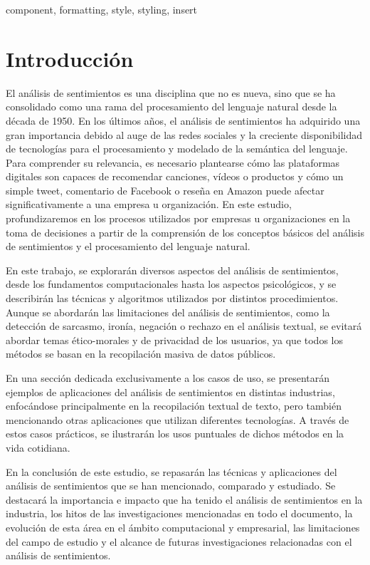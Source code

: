 \documentclass[conference]{IEEEtran}
\begin{document}
\begin{IEEEkeywords}
component, formatting, style, styling, insert
\end{IEEEkeywords}

\section{Introducción}
El análisis de sentimientos es una disciplina que no es nueva, sino que se ha consolidado como una rama del procesamiento del lenguaje natural desde la década de 1950. 
En los últimos años, el análisis de sentimientos ha adquirido una gran importancia debido al auge de las redes sociales y la creciente disponibilidad de tecnologías para el procesamiento y modelado de la semántica del lenguaje. 
Para comprender su relevancia, es necesario plantearse cómo las plataformas digitales son capaces de recomendar canciones, vídeos o productos y cómo un simple tweet, comentario de Facebook o reseña en Amazon puede afectar significativamente a una empresa u organización. 
En este estudio, profundizaremos en los procesos utilizados por empresas u organizaciones en la toma de decisiones a partir de la comprensión de los conceptos básicos del análisis de sentimientos y el procesamiento del lenguaje natural.

En este trabajo, se explorarán diversos aspectos del análisis de sentimientos, desde los fundamentos computacionales hasta los aspectos psicológicos, y se describirán las técnicas y algoritmos utilizados por distintos procedimientos. 
Aunque se abordarán las limitaciones del análisis de sentimientos, como la detección de sarcasmo, ironía, negación o rechazo en el análisis textual, se evitará abordar temas ético-morales y de privacidad de los usuarios, ya que todos los métodos se basan en la recopilación masiva de datos públicos.

En una sección dedicada exclusivamente a los casos de uso, se presentarán ejemplos de aplicaciones del análisis de sentimientos en distintas industrias, enfocándose principalmente en la recopilación textual de texto, pero también mencionando otras aplicaciones que utilizan diferentes tecnologías. 
A través de estos casos prácticos, se ilustrarán los usos puntuales de dichos métodos en la vida cotidiana.

En la conclusión de este estudio, se repasarán las técnicas y aplicaciones del análisis de sentimientos que se han mencionado, comparado y estudiado. 
Se destacará la importancia e impacto que ha tenido el análisis de sentimientos en la industria, los hitos de las investigaciones mencionadas en todo el documento, la evolución de esta área en el ámbito computacional y empresarial, las limitaciones del campo de estudio y el alcance de futuras investigaciones relacionadas con el análisis de sentimientos.
\end{document}
